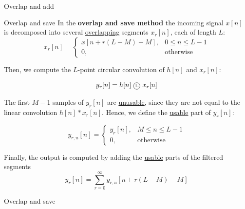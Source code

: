 \documentclass[10pt, handout]{beamer}
\begin{document}
%
\begin{frame}{Overlap and add}
\begin{center}
	\resizebox{0.85\textwidth}{!}{}
\end{center}	
\end{frame}

%
\begin{frame}{Overlap and save}
In the \textbf{overlap and save method} the incoming signal $x[n]$ is decomposed into several \underline{overlapping} segments $x_r[n]$, each of length $L$:
\begin{equation*}
x_r[n] = \begin{cases}
x[n + r(L-M) - M], & 0 \leq n \leq L-1\\
0, & \text{otherwise}
\end{cases}
\end{equation*}

Then, we compute the $L$-point circular convolution of $h[n]$ and $x_r[n]$:

\begin{equation*}
y_r[n] = h[n]~\encircle{L}~x_r[n]
\end{equation*}

The first $M-1$ samples of $y_r[n]$ are \underline{unusable}, since they are not equal to the linear convolution  $h[n]\ast x_r[n]$. Hence, we define the \underline{usable} part of $y_r[n]$:

\begin{equation*}
y_{r,u}[n] = \begin{cases}
y_r[n], & M \leq n \leq L-1 \\
0, &\text{otherwise}
\end{cases}
\end{equation*}

Finally, the output is computed by adding the \underline{usable} parts of the filtered segments
\begin{equation*}
y_r[n] = \sum_{r = 0}^{\infty} y_{r, u}[n + r(L-M) - M]
\end{equation*}
\end{frame}

%
\begin{frame}{Overlap and save}
\begin{center}
	\resizebox{0.85\textwidth}{!}{}
\end{center}	
\end{frame}
\end{document}

